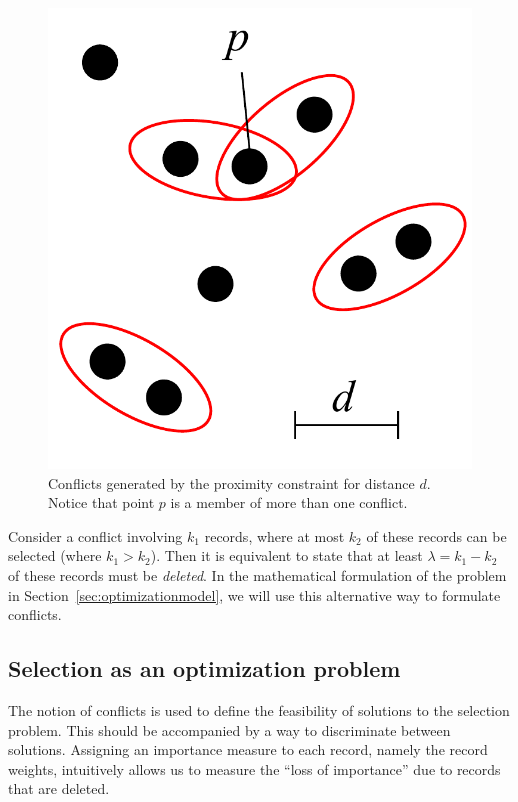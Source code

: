 \documentclass[11pt, oneside]{report}
\begin{document}
\begin{figure}[htbp]
\begin{center}
\includegraphics[scale=.3]{figs-cvl/cvl_proximity_conflicts.pdf}
\caption{Conflicts generated by the proximity constraint for distance $d$. Notice that point $p$ is a member of more than one conflict.}
\label{fig:cvl:proximity:conflict}
\end{center}
\vspace*{-4ex}
\end{figure}

Consider a conflict involving $k_1$ records, where at most $k_2$ of these records can be selected (where $k_1 > k_2$). Then it is equivalent to state that at least $\lambda = k_1 - k_2$ of these records must be \emph{deleted}. In the mathematical formulation of the problem in Section~\ref{sec:optimizationmodel}, we will use this alternative way to formulate conflicts.

\subsection{Selection as an optimization problem}
\label{sec:cvl:filtering}
The notion of conflicts is used to define the feasibility of solutions to the selection problem. This should be accompanied by a way to discriminate between solutions. Assigning an importance measure to each record, namely the record weights, intuitively allows us to measure the ``loss of importance'' due to records that are deleted.
\end{document}
